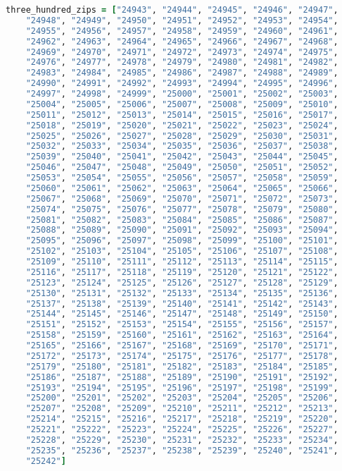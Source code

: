 \begin{appendix}
\begin{lstlisting}[language=Ruby]
three_hundred_zips = ["24943", "24944", "24945", "24946", "24947",
    "24948", "24949", "24950", "24951", "24952", "24953", "24954",
    "24955", "24956", "24957", "24958", "24959", "24960", "24961",
    "24962", "24963", "24964", "24965", "24966", "24967", "24968",
    "24969", "24970", "24971", "24972", "24973", "24974", "24975",
    "24976", "24977", "24978", "24979", "24980", "24981", "24982",
    "24983", "24984", "24985", "24986", "24987", "24988", "24989",
    "24990", "24991", "24992", "24993", "24994", "24995", "24996",
    "24997", "24998", "24999", "25000", "25001", "25002", "25003",
    "25004", "25005", "25006", "25007", "25008", "25009", "25010",
    "25011", "25012", "25013", "25014", "25015", "25016", "25017",
    "25018", "25019", "25020", "25021", "25022", "25023", "25024",
    "25025", "25026", "25027", "25028", "25029", "25030", "25031",
    "25032", "25033", "25034", "25035", "25036", "25037", "25038",
    "25039", "25040", "25041", "25042", "25043", "25044", "25045",
    "25046", "25047", "25048", "25049", "25050", "25051", "25052",
    "25053", "25054", "25055", "25056", "25057", "25058", "25059",
    "25060", "25061", "25062", "25063", "25064", "25065", "25066",
    "25067", "25068", "25069", "25070", "25071", "25072", "25073",
    "25074", "25075", "25076", "25077", "25078", "25079", "25080",
    "25081", "25082", "25083", "25084", "25085", "25086", "25087", 
    "25088", "25089", "25090", "25091", "25092", "25093", "25094",
    "25095", "25096", "25097", "25098", "25099", "25100", "25101",
    "25102", "25103", "25104", "25105", "25106", "25107", "25108",
    "25109", "25110", "25111", "25112", "25113", "25114", "25115",
    "25116", "25117", "25118", "25119", "25120", "25121", "25122",
    "25123", "25124", "25125", "25126", "25127", "25128", "25129",
    "25130", "25131", "25132", "25133", "25134", "25135", "25136",
    "25137", "25138", "25139", "25140", "25141", "25142", "25143",
    "25144", "25145", "25146", "25147", "25148", "25149", "25150",
    "25151", "25152", "25153", "25154", "25155", "25156", "25157",
    "25158", "25159", "25160", "25161", "25162", "25163", "25164",
    "25165", "25166", "25167", "25168", "25169", "25170", "25171",
    "25172", "25173", "25174", "25175", "25176", "25177", "25178",
    "25179", "25180", "25181", "25182", "25183", "25184", "25185",
    "25186", "25187", "25188", "25189", "25190", "25191", "25192",
    "25193", "25194", "25195", "25196", "25197", "25198", "25199",
    "25200", "25201", "25202", "25203", "25204", "25205", "25206",
    "25207", "25208", "25209", "25210", "25211", "25212", "25213",
    "25214", "25215", "25216", "25217", "25218", "25219", "25220",
    "25221", "25222", "25223", "25224", "25225", "25226", "25227",
    "25228", "25229", "25230", "25231", "25232", "25233", "25234",
    "25235", "25236", "25237", "25238", "25239", "25240", "25241",
    "25242"]


\end{lstlisting}
\end{appendix}
